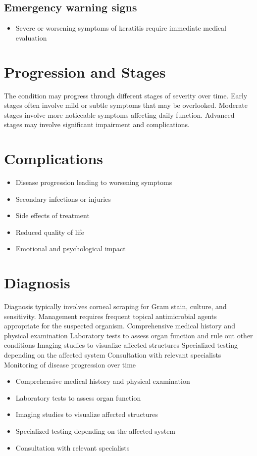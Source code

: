 \subsection{Emergency warning signs}
\begin{itemize}[noitemsep]
  \item Severe or worsening symptoms of keratitis require immediate medical evaluation
\end{itemize}
\section{Progression and Stages}
The condition may progress through different stages of severity over time. Early stages often involve mild or subtle symptoms that may be overlooked. Moderate stages involve more noticeable symptoms affecting daily function. Advanced stages may involve significant impairment and complications.
\section{Complications}
\begin{itemize}[noitemsep]
  \item Disease progression leading to worsening symptoms
  \item Secondary infections or injuries
  \item Side effects of treatment
  \item Reduced quality of life
  \item Emotional and psychological impact
\end{itemize}
\section{Diagnosis}
Diagnosis typically involves corneal scraping for Gram stain, culture, and sensitivity. Management requires frequent topical antimicrobial agents appropriate for the suspected organism. Comprehensive medical history and physical examination Laboratory tests to assess organ function and rule out other conditions Imaging studies to visualize affected structures Specialized testing depending on the affected system Consultation with relevant specialists Monitoring of disease progression over time

\begin{itemize}[noitemsep]
  \item Comprehensive medical history and physical examination
  \item Laboratory tests to assess organ function
  \item Imaging studies to visualize affected structures
  \item Specialized testing depending on the affected system
  \item Consultation with relevant specialists
\end{itemize}
